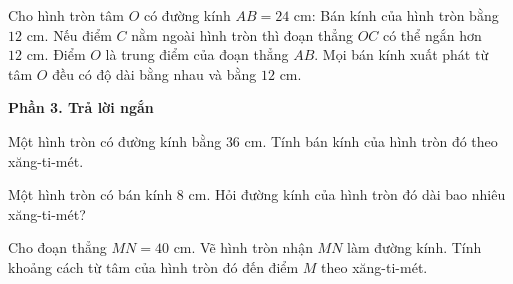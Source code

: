 \begin{ex} %
Cho hình tròn tâm $O$ có đường kính $AB = 24\text{ cm}$:
\choiceTF
{\True Bán kính của hình tròn bằng $12\text{ cm}$.}
{Nếu điểm $C$ nằm ngoài hình tròn thì đoạn thẳng $OC$ có thể ngắn hơn $12\text{ cm}$.}
{\True Điểm $O$ là trung điểm của đoạn thẳng $AB$.}
{\True Mọi bán kính xuất phát từ tâm $O$ đều có độ dài bằng nhau và bằng $12\text{ cm}$.}
\end{ex}

\textbf{Phần 3. Trả lời ngắn}

\begin{ex} %
Một hình tròn có đường kính bằng $36\text{ cm}$. Tính bán kính của hình tròn đó theo xăng-ti-mét.
\end{ex}

\begin{ex} %
Một hình tròn có bán kính $8\text{ cm}$. Hỏi đường kính của hình tròn đó dài bao nhiêu xăng-ti-mét?
\end{ex}

\begin{ex} %
Cho đoạn thẳng $MN = 40\text{ cm}$. Vẽ hình tròn nhận $MN$ làm đường kính. Tính khoảng cách từ tâm của hình tròn đó đến điểm $M$ theo xăng-ti-mét.
\end{ex}

